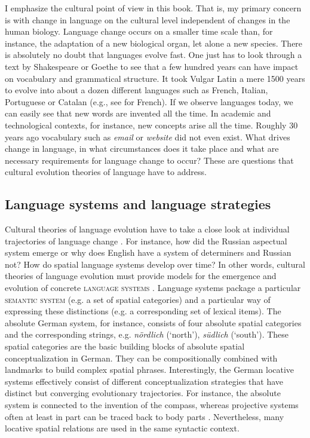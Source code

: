 I emphasize the cultural point of view in this book. That is, my primary concern is
with change in language on the cultural level independent of changes in the human 
biology. Language change occurs on a smaller time scale than, for instance, the 
adaptation of a new biological organ, let alone a new species. There is absolutely no 
doubt that languages evolve fast. One just has to look through a text by 
Shakespeare or Goethe to see that a few hundred years can have impact
on vocabulary and grammatical structure. It took Vulgar Latin a mere 1500 years to 
evolve into about a dozen different languages such as French, Italian, 
Portuguese or Catalan (e.g., see \citealt{pope1952latin} for French). 
If we observe languages today, we can easily see 
that new words are invented all the time.
In academic and technological contexts, for instance, new concepts arise all the time.
Roughly 30 years ago vocabulary such as \textit{email} or \textit{website} did not even exist.
What drives change in language, in what circumstances does it take place and 
what are necessary requirements for language change to occur? These are questions 
that cultural evolution theories of language have to address.

\subsection{Language systems and language strategies}
Cultural theories of language evolution have to take a close look at individual 
trajectories of language change \citep{steels2011self-organization}. For instance, 
how did the Russian aspectual system emerge or why does English have a
system of determiners and Russian not? How do spatial language systems 
develop over time? In other words, cultural theories of language
evolution must provide models for the emergence and evolution of concrete
\textsc{language systems} \citep{steels2011self-organization}. 
Language systems package a particular 
\textsc{semantic system} (e.g. a set of spatial categories) and a 
particular way of expressing these distinctions (e.g. a corresponding set of 
lexical items). The absolute German system, for instance, consists of 
four absolute spatial categories and the corresponding strings, e.g. 
\textit{n\"ordlich} (`north'), \textit{s\"udlich} (`south'). These spatial
categories are the basic building blocks of absolute spatial conceptualization 
in German. They can be compositionally combined with landmarks to
build complex spatial phrases. Interestingly, the 
German locative systems effectively consist of different conceptualization
strategies that have distinct but converging evolutionary trajectories. For instance,
the absolute system is connected to the invention of the compass,
whereas projective systems often at least in part can be traced back to 
body parts \citep{traugott1991grammaticalization}.
Nevertheless, many locative spatial relations are used in the same syntactic 
context.

